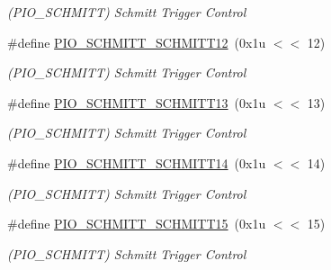 \begin{DoxyCompactItemize}
\begin{DoxyCompactList}\small\item\em (P\+I\+O\+\_\+\+S\+C\+H\+M\+I\+TT) Schmitt Trigger Control \end{DoxyCompactList}\item 
\mbox{\label{group__SAMS70__PIO_ga72e6308c136721a1fce4c02a21b932e6}} 
\#define \mbox{\hyperlink{group__SAMS70__PIO_ga72e6308c136721a1fce4c02a21b932e6}{P\+I\+O\+\_\+\+S\+C\+H\+M\+I\+T\+T\+\_\+\+S\+C\+H\+M\+I\+T\+T12}}~(0x1u $<$$<$ 12)
\begin{DoxyCompactList}\small\item\em (P\+I\+O\+\_\+\+S\+C\+H\+M\+I\+TT) Schmitt Trigger Control \end{DoxyCompactList}\item 
\mbox{\label{group__SAMS70__PIO_ga37fbc7434be639e20c71808b24d68bbd}} 
\#define \mbox{\hyperlink{group__SAMS70__PIO_ga37fbc7434be639e20c71808b24d68bbd}{P\+I\+O\+\_\+\+S\+C\+H\+M\+I\+T\+T\+\_\+\+S\+C\+H\+M\+I\+T\+T13}}~(0x1u $<$$<$ 13)
\begin{DoxyCompactList}\small\item\em (P\+I\+O\+\_\+\+S\+C\+H\+M\+I\+TT) Schmitt Trigger Control \end{DoxyCompactList}\item 
\mbox{\label{group__SAMS70__PIO_ga0711afb394626f9801d9a145f77af2c5}} 
\#define \mbox{\hyperlink{group__SAMS70__PIO_ga0711afb394626f9801d9a145f77af2c5}{P\+I\+O\+\_\+\+S\+C\+H\+M\+I\+T\+T\+\_\+\+S\+C\+H\+M\+I\+T\+T14}}~(0x1u $<$$<$ 14)
\begin{DoxyCompactList}\small\item\em (P\+I\+O\+\_\+\+S\+C\+H\+M\+I\+TT) Schmitt Trigger Control \end{DoxyCompactList}\item 
\mbox{\label{group__SAMS70__PIO_ga592235d8c45c3a4b59aa0b56a68c8252}} 
\#define \mbox{\hyperlink{group__SAMS70__PIO_ga592235d8c45c3a4b59aa0b56a68c8252}{P\+I\+O\+\_\+\+S\+C\+H\+M\+I\+T\+T\+\_\+\+S\+C\+H\+M\+I\+T\+T15}}~(0x1u $<$$<$ 15)
\begin{DoxyCompactList}\small\item\em (P\+I\+O\+\_\+\+S\+C\+H\+M\+I\+TT) Schmitt Trigger Control \end{DoxyCompactList}\item 

\end{DoxyCompactItemize}
